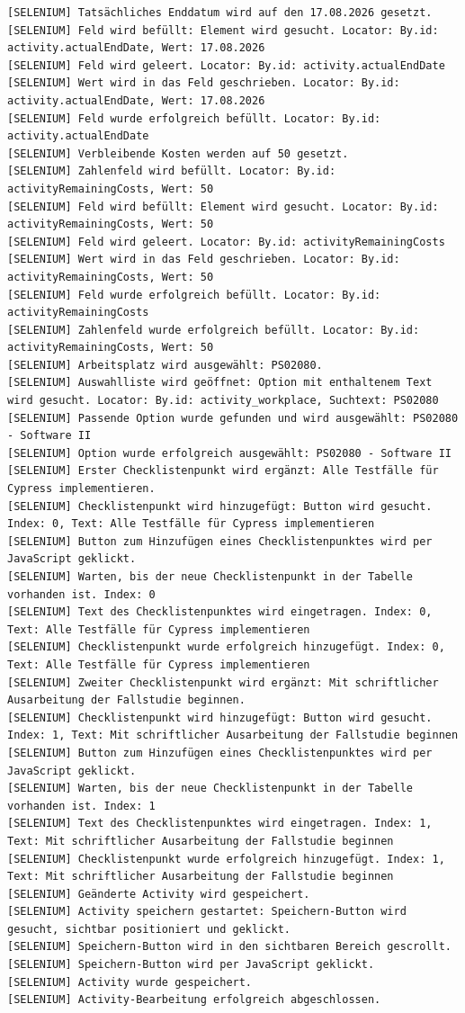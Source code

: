 \begin{lstlisting}[caption={Selenium -- Activity bearbeiten (Erfolgreich)}, label={lst:sel_edit_act_ok}, style=logStyle]
[SELENIUM] Tatsächliches Enddatum wird auf den 17.08.2026 gesetzt.
[SELENIUM] Feld wird befüllt: Element wird gesucht. Locator: By.id: activity.actualEndDate, Wert: 17.08.2026
[SELENIUM] Feld wird geleert. Locator: By.id: activity.actualEndDate
[SELENIUM] Wert wird in das Feld geschrieben. Locator: By.id: activity.actualEndDate, Wert: 17.08.2026
[SELENIUM] Feld wurde erfolgreich befüllt. Locator: By.id: activity.actualEndDate
[SELENIUM] Verbleibende Kosten werden auf 50 gesetzt.
[SELENIUM] Zahlenfeld wird befüllt. Locator: By.id: activityRemainingCosts, Wert: 50
[SELENIUM] Feld wird befüllt: Element wird gesucht. Locator: By.id: activityRemainingCosts, Wert: 50
[SELENIUM] Feld wird geleert. Locator: By.id: activityRemainingCosts
[SELENIUM] Wert wird in das Feld geschrieben. Locator: By.id: activityRemainingCosts, Wert: 50
[SELENIUM] Feld wurde erfolgreich befüllt. Locator: By.id: activityRemainingCosts
[SELENIUM] Zahlenfeld wurde erfolgreich befüllt. Locator: By.id: activityRemainingCosts, Wert: 50
[SELENIUM] Arbeitsplatz wird ausgewählt: PS02080.
[SELENIUM] Auswahlliste wird geöffnet: Option mit enthaltenem Text wird gesucht. Locator: By.id: activity_workplace, Suchtext: PS02080
[SELENIUM] Passende Option wurde gefunden und wird ausgewählt: PS02080 - Software II
[SELENIUM] Option wurde erfolgreich ausgewählt: PS02080 - Software II
[SELENIUM] Erster Checklistenpunkt wird ergänzt: Alle Testfälle für Cypress implementieren.
[SELENIUM] Checklistenpunkt wird hinzugefügt: Button wird gesucht. Index: 0, Text: Alle Testfälle für Cypress implementieren
[SELENIUM] Button zum Hinzufügen eines Checklistenpunktes wird per JavaScript geklickt.
[SELENIUM] Warten, bis der neue Checklistenpunkt in der Tabelle vorhanden ist. Index: 0
[SELENIUM] Text des Checklistenpunktes wird eingetragen. Index: 0, Text: Alle Testfälle für Cypress implementieren
[SELENIUM] Checklistenpunkt wurde erfolgreich hinzugefügt. Index: 0, Text: Alle Testfälle für Cypress implementieren
[SELENIUM] Zweiter Checklistenpunkt wird ergänzt: Mit schriftlicher Ausarbeitung der Fallstudie beginnen.
[SELENIUM] Checklistenpunkt wird hinzugefügt: Button wird gesucht. Index: 1, Text: Mit schriftlicher Ausarbeitung der Fallstudie beginnen
[SELENIUM] Button zum Hinzufügen eines Checklistenpunktes wird per JavaScript geklickt.
[SELENIUM] Warten, bis der neue Checklistenpunkt in der Tabelle vorhanden ist. Index: 1
[SELENIUM] Text des Checklistenpunktes wird eingetragen. Index: 1, Text: Mit schriftlicher Ausarbeitung der Fallstudie beginnen
[SELENIUM] Checklistenpunkt wurde erfolgreich hinzugefügt. Index: 1, Text: Mit schriftlicher Ausarbeitung der Fallstudie beginnen
[SELENIUM] Geänderte Activity wird gespeichert.
[SELENIUM] Activity speichern gestartet: Speichern-Button wird gesucht, sichtbar positioniert und geklickt.
[SELENIUM] Speichern-Button wird in den sichtbaren Bereich gescrollt.
[SELENIUM] Speichern-Button wird per JavaScript geklickt.
[SELENIUM] Activity wurde gespeichert.
[SELENIUM] Activity-Bearbeitung erfolgreich abgeschlossen.
\end{lstlisting}


